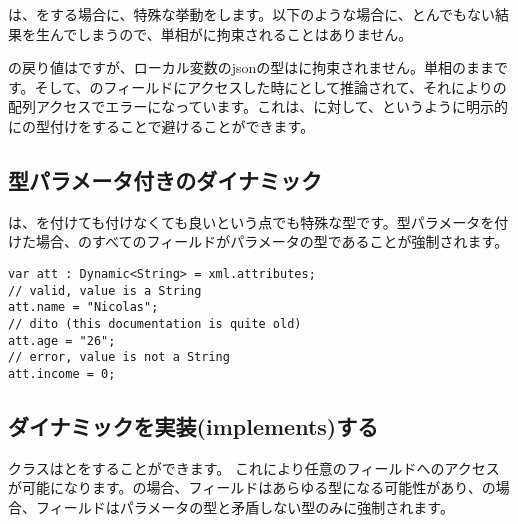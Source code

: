 は、をする場合に、特殊な挙動をします。以下のような場合に、とんでもない結果を生んでしまうので、単相がに拘束されることはありません。


の戻り値はですが、ローカル変数のjsonの型はに拘束されません。単相のままです。そして、のフィールドにアクセスした時にとして推論されて、それによりの配列アクセスでエラーになっています。これは、に対して、というように明示的にの型付けをすることで避けることができます。


\subsection{型パラメータ付きのダイナミック}
\label{types-dynamic-with-type-parameter}

は、を付けても付けなくても良いという点でも特殊な型です。型パラメータを付けた場合、のすべてのフィールドがパラメータの型であることが強制されます。

\begin{lstlisting}
var att : Dynamic<String> = xml.attributes;
// valid, value is a String
att.name = "Nicolas";
// dito (this documentation is quite old)
att.age = "26";
// error, value is not a String
att.income = 0;
\end{lstlisting}


\subsection{ダイナミックを実装(implements)する}
\label{types-dynamic-implemented}

クラスはとをすることができます。
これにより任意のフィールドへのアクセスが可能になります。の場合、フィールドはあらゆる型になる可能性があり、の場合、フィールドはパラメータの型と矛盾しない型のみに強制されます。

